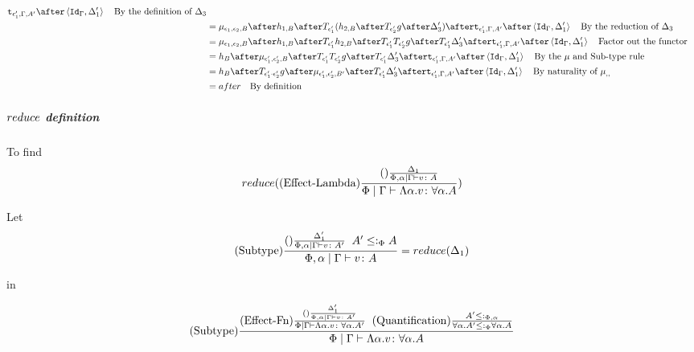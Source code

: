 \documentclass{report}
\begin{document}
\begin{align}
                    \tstrength{\e_1'}{\G}{A'}\after\pr{\idg}{\D_1'}\qt{By the definition of $\D_3$}\\
                    &= \bind{\e_1}{\e_2}{B}\after 
                    h_{1, B}\after\T{\e_1'}{(h_{2, B}\after\T{\e_2'}{g}\after \D_3')}\after
                    \tstrength{\e_1'}{\G}{A'}\after\pr{\idg}{\D_1'}\qt{By the reduction of $\D_3$}\\
                    &= \bind{\e_1}{\e_2}{B}\after 
                    h_{1, B}\after\T{\e_1'}{h_{2, B}}\after\T{\e_1'}{\T{\e_2'}{g}}\after \T{\e_1'}{\D_3'}\after
                    \tstrength{\e_1'}{\G}{A'}\after\pr{\idg}{\D_1'}\qt{Factor out the functor}\\
                    &= h_B\after\bind{\e_1'}{\e_2'}{B}\after\T{\e_1'}{\T{\e_2'}{g}}\after \T{\e_1'}{\D_3'}\after
                    \tstrength{\e_1'}{\G}{A'}\after\pr{\idg}{\D_1'}\qt{By the $\mu$ and Sub-type rule }\\
                    & = h_B\after\T{\e_1'\dot\e_2'}{g}\after\bind{\e_1'}{\e_2'}{B'}\after \T{\e_1'}{\D_3'}\after
                    \tstrength{\e_1'}{\G}{A'}\after\pr{\idg}{\D_1'}\qt{By naturality of $\bind{}{}{}$ }\\
                    & = after \qt{By definition}
                \end{align}

        \subparagraph{$reduce$ definition}

        
        To find 
        \begin{equation}
            reduce((\text{Effect-Lambda}) \frac{(\text{}) \frac{\Delta_1}{\Phi,\alpha\mid\Gamma \vdash v \colon A}}{\Phi\mid\Gamma \vdash \Lambda \alpha. v \colon \forall \alpha. A})
        \end{equation}

        Let
        \begin{equation}
            (\text{Subtype}) \frac{(\text{}) \frac{\Delta_1'}{\Phi,\alpha\mid\Gamma \vdash v \colon A'}\;\; A'\leq:_\Phi A}{\Phi,\alpha\mid\Gamma \vdash v \colon A} = reduce(\Delta_1)
        \end{equation}

        in 

        \begin{equation}
            (\text{Subtype}) \frac{
                (\text{Effect-Fn}) \frac{
                    (\text{}) \frac{\Delta_1'}{\Phi,\alpha\mid\Gamma \vdash v \colon A'}
                }{
                    \Phi\mid\Gamma \vdash \Lambda \alpha. v \colon \forall \alpha. A'
                }
            \;\; 
            (\text{Quantification}) \frac{A' \leq:_{\Phi, \alpha}}{\forall \alpha. A' \leq:_\Phi \forall \alpha. A}
            }{
                \Phi\mid\Gamma \vdash \Lambda \alpha. v \colon \forall \alpha. A
            }
        \end{equation}
\end{document}
